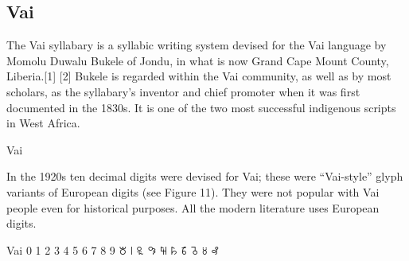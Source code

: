\subsection{Vai}

The Vai syllabary is a syllabic writing system devised for the Vai language by Momolu Duwalu Bukele of Jondu, in what is now Grand Cape Mount County, Liberia.[1] [2] Bukele is regarded within the Vai community, as well as by most scholars, as the syllabary's inventor and chief promoter when it was first documented in the 1830s. It is one of the two most successful indigenous scripts in West Africa.

\newfontfamily{}
\begin{scriptexample}[]{Vai}
\end{scriptexample}

In the 1920s ten decimal digits were devised for Vai; these were “Vai-style” glyph variants of
European digits (see Figure 11). They were not popular with Vai people  even for historical purposes. All
the modern literature uses European digits.


\begin{scriptexample}[]{Vai}
\bgroup
\vai
\obeylines\Large
0	1	2	3	4	5	6	7	8	9
꘠	꘡	꘢	꘣	꘤	꘥	꘦	꘧	꘨	꘩
\vai
\egroup
\end{scriptexample}